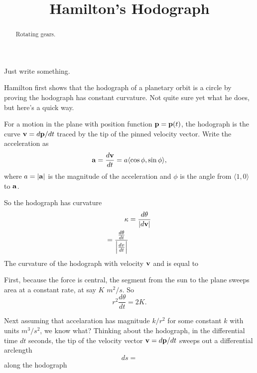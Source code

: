 \documentclass{ximera}
\title{Hamilton's Hodograph}
\begin{document}
\begin{abstract}
Rotating gears.
\end{abstract}
\maketitle


Just write something.

Hamilton first shows that the hodograph of a planetary orbit is a circle by proving the hodograph has constant curvature. Not quite sure yet what he does, but here's a quick way.

For a motion in the plane with position function ${\bf p} = {\bf p}(t)$, the hodograph is the curve ${\bf v} =d{\bf p}/dt$ traced by the tip of the pinned velocity vector. Write the acceleration as
\[
   {\bf a} = \frac{d{\bf v}}{dt} =  a \langle \cos\phi , \sin \phi   \rangle ,
\]
where $a=|{\bf a}|$ is the magnitude of the acceleration and $\phi$ is the angle from $\langle 1, 0 \rangle$ to ${\bf a}$. 

So the hodograph has curvature
\begin{align*}
      \kappa  &= \frac{d\theta}{|d{\bf v}|}  \\
         = \frac{\frac{d\theta}{dt}}{\Big| \frac{dv}{dt}  \Big|}
\end{align*}
The curvature of the hodograph with velocity ${\bf v}$ and  is equal to 

First, because the force is central, the segment from the sun to the plane sweeps area at a constant rate, at say $K$ $m^2/s$.  So
\[
   r^2 \frac{d\theta}{dt} = 2K .
\]

Next assuming that accelaration has magnitude $k/r^2$ for some constant $k$ with units $m^3/s^2$, we know what? Thinking about the hodograph, in the differential time $dt$ seconds, the tip of the velocity vector ${\bf v} = d{\bf p}/dt$ sweeps out a differential arclength
\[
  ds = 
\] 
along the hodograph
\end{document}

